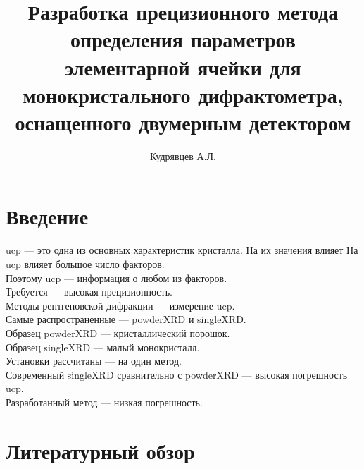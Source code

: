 \documentclass[a4paper, 12pt]{article}
\author{Кудрявцев А.Л.}
\title{Разработка прецизионного метода определения параметров элементарной ячейки для монокристального дифрактометра, оснащенного двумерным детектором}
\begin{document}
\maketitle
\newpage
\tableofcontents
\newpage
\section{Введение}
\gls{ucp} --- это одна из основных характеристик кристалла. На их значения влияет 
На \gls{ucp} влияет большое число факторов. \\
Поэтому \gls{ucp} --- информация о любом из факторов. \\
Требуется --- высокая прецизионность. \\
Методы рентгеновской дифракции --- измерение \gls{ucp}. \\
Самые распространенные --- \gls{powderXRD} и \gls{singleXRD}. \\
Образец \gls{powderXRD} --- кристаллический порошок. \\
Образец \gls{singleXRD} --- малый монокристалл. \\
Установки рассчитаны --- на один метод. \\
Современный \gls{singleXRD} сравнительно с \gls{powderXRD} --- высокая погрешность \gls{ucp}. \\
Разработанный метод --- низкая погрешность.
\section{Литературный обзор}
\end{document}
